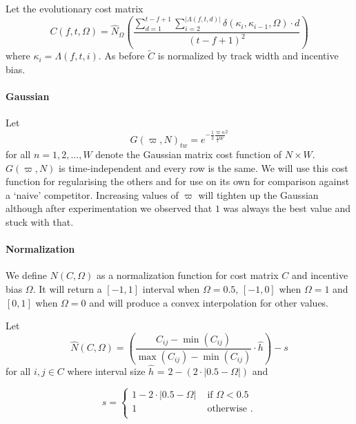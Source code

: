\documentclass[twocolumn]{article}
\begin{document}
	Let the evolutionary cost matrix
	\begin{dmath*} C(f, t, \Omega) =  
		\hat N_\Omega\left(\frac{
		\sum_{d=1}^{t-f+1} 
		\sum_{i=2}^{|\Lambda( f,t,d )|}  \delta( \kappa_{i}, \kappa_{i-1}, \Omega ) \cdot d
	}{(t-f+1)^2}\right)
	\end{dmath*}  where  $\kappa_i=\Lambda( f,t,i )$. As before $\tilde C$ is normalized by track width and incentive bias.
	
	\paragraph{Gaussian}
	Let \[
	G( \varpi, N )_{tw} = e^{ - \frac{1}{2} \frac{\varpi n}{ \frac{1}{2} W}^2  }
	\] for all $n=1,2,\ldots,W$ denote the Gaussian matrix cost function of $N\times W$. $G( \varpi, N )$ is time-independent and every row is the same. We will use this cost function for regularising the others and for use on its own for comparison against a `naive' competitor. Increasing values of $\varpi$ will tighten up the Gaussian although after experimentation we observed that $1$ was always the best value and stuck with that.
	
	\paragraph{Normalization}
	
	We define $N(C,\Omega)$ as a normalization function for cost matrix $C$ and incentive bias $\Omega$. It will return a $[-1,1]$ interval when $\Omega=0.5$, $[-1,0]$ when $\Omega=1$  and $[0, 1]$ when $\Omega=0$ and will produce a convex interpolation for other values.
	
	Let 
	\begin{dmath*}
		\hat N(C,\Omega) = \left( \frac{ C_{ij} - \min \left( C_{ij} \right) }{ \max \left( C_{ij} \right) - \min \left( C_{ij} \right) } \cdot \hat h  \right)-s
	\end{dmath*}
	for all $i,j \in C$ where interval size $\hat h$ = $2-\left( 2\cdot|0.5-\Omega| \right)$ and 
	
	\begin{dmath*}
		s= { \left\{
			\begin{array}{ll}
				1-2 \cdot |0.5-\Omega| & \mbox{~if~}\Omega < 0.5   \\
				1 & \mbox{~otherwise~}.  \\
			\end{array}
			\right.}
	\end{dmath*}
	
\end{document}

